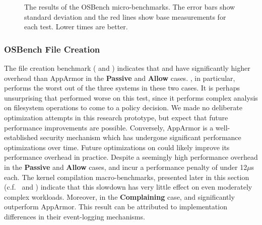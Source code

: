 \begin{figure}[htp]
{  }
  \caption[The results of the OSBench micro-benchmarks]{
    The results of the OSBench micro-benchmarks. The error bars show standard
    deviation and the red lines show base measurements for each test. Lower times are
    better.
  }%
  \label{fig:osbench}
\end{figure}

\subsubsection{OSBench File Creation}

The file creation benchmark ( and )
indicates that \bpfbox{} and \bpfcontain{} have significantly higher overhead than
AppArmor in the \textbf{Passive} and \textbf{Allow} cases. \bpfcontain{}, in particular,
performs the worst out of the three systems in these two cases. It is perhaps unsurprising
that \bpfcontain{} performed worse on this test, since it performs complex analysis on
filesystem operations to come to a policy decision. We made no deliberate optimization
attempts in this research prototype, but expect that future performance improvements are
possible.  Conversely, AppArmor is a well-established security mechanism which has
undergone significant performance optimizations over time. Future optimizations on
\bpfcontain{} could likely improve its performance overhead in practice. Despite
a seemingly high performance overhead in the \textbf{Passive} and \textbf{Allow} cases,
\bpfbox{} and \bpfcontain{} incur a performance penalty of under 12$\mu$s each.  The
kernel compilation macro-benchmarks, presented later in this section
(c.f.\  and ) indicate that
this slowdown has very little effect on even moderately complex workloads.  Moreover, in
the \textbf{Complaining} case, \bpfbox{} and \bpfcontain{} significantly outperform
AppArmor. This result can be attributed to implementation differences in their
event-logging mechanisms.

